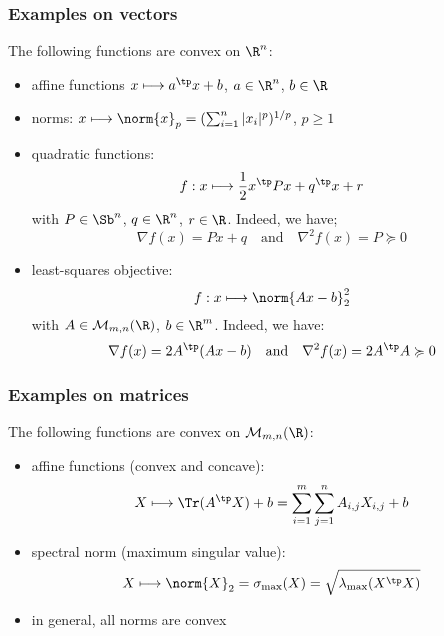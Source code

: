 \subsubsection{Examples on vectors}
The following functions are convex on $\R^n$:
\begin{itemize}
    \item affine functions $x\longmapsto a^\tp x + b$, $a\in\R^n$, $b\in\R$
    \item norms: $x\longmapsto \norm{x}_p = (\sum_{i=1}^n|x_i|^p)^{1/p}$, $p\geq 1$
    \item quadratic functions:
    \begin{equation*}
        f: x\longmapsto \frac{1}{2}x^\tp Px + q^\tp x + r
    \end{equation*}
    with $P\in\Sb^n$, $q\in\R^n$, $r\in\R$. Indeed, we have;
    \begin{equation*}
        \nabla f(x) = Px+q \quad \text{and} \quad \nabla^2 f(x) = P\succcurlyeq 0
    \end{equation*}
    \item least-squares objective:
    \begin{equation*}
        f: x\longmapsto \norm{Ax-b}_2^2
    \end{equation*}
    with $A\in\mathcal{M}_{m,n}(\R)$, $b\in\R^m$. Indeed, we have:
    \begin{equation*}
        \nabla f(x) = 2A^\tp(Ax-b) \quad \text{and} \quad \nabla^2 f(x) = 2A^\tp A\succcurlyeq 0
    \end{equation*}
\end{itemize}

\subsubsection{Examples on matrices}
The following functions are convex on $\mathcal{M}_{m,n}(\R)$:
\begin{itemize}
    \item affine functions (convex and concave):
    \begin{equation*}
        X \longmapsto \Tr(A^\tp X) + b = \sum_{i=1}^m\sum_{j=1}^n A_{i,j}X_{i,j} + b
    \end{equation*}
    \item spectral norm (maximum singular value):
    \begin{equation*}
        X \longmapsto \norm{X}_2 = \sigma_{\max}(X) = \sqrt{\lambda_{\max}(X^\tp X)}
    \end{equation*}
    \item in general, all norms are convex
\end{itemize}

